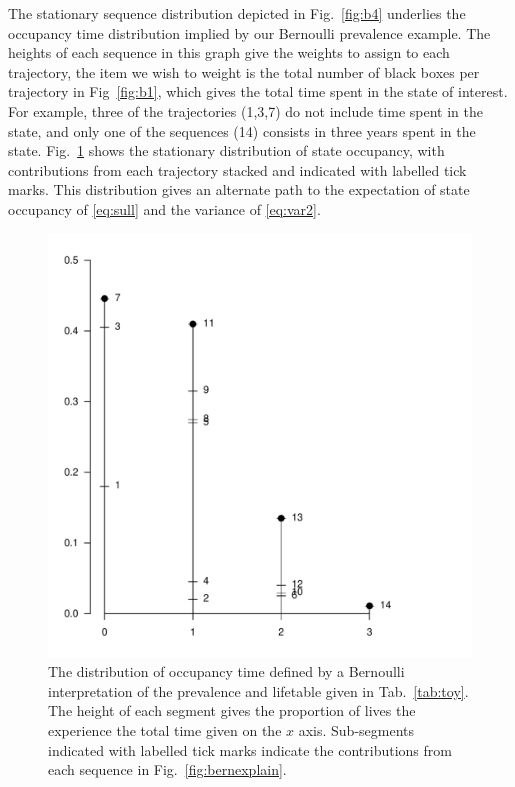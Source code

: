 \documentclass{bmcart}
\begin{document}
The stationary sequence distribution depicted in Fig.~\ref{fig:b4} underlies the occupancy time distribution implied by our Bernoulli prevalence example. The heights of each sequence in this graph give the weights to assign to each trajectory, the item we wish to weight is the total number of black boxes per trajectory in Fig~\ref{fig:b1}, which gives the total time spent in the state of interest. For example, three of the trajectories (1,3,7) do not include time spent in the state, and only one of the sequences (14) consists in three years spent in the state. Fig.~\ref{fig:DiDist} shows the stationary distribution of state occupancy, with contributions from each trajectory stacked and indicated with labelled tick marks. This distribution gives an alternate path to the expectation of state occupancy of \eqref{eq:sull} and the variance of \eqref{eq:var2}. 
\begin{figure}[ht!]
\centering
\includegraphics[scale=.6]{Figures/DiDist.pdf}
\caption{The distribution of occupancy time defined by a Bernoulli interpretation of the prevalence and lifetable given in Tab.~\ref{tab:toy}. The height of each segment gives the proportion of lives the experience the total time given on the $x$ axis. Sub-segments indicated with labelled tick marks indicate the contributions from each sequence in Fig.~\ref{fig:bernexplain}.}\label{fig:DiDist}
\end{figure}
\FloatBarrier
\end{document}
